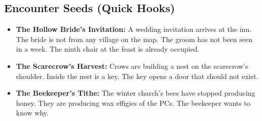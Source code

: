 \subsection*{Encounter Seeds (Quick Hooks)}
\begin{itemize}
\item \textbf{The Hollow Bride's Invitation:} A wedding invitation arrives at the inn. The bride is not from any village on the map. The groom has not been seen in a week. The ninth chair at the feast is already occupied.
\item \textbf{The Scarecrow's Harvest:} Crows are building a nest on the scarecrow's shoulder. Inside the nest is a key. The key opens a door that should not exist.
\item \textbf{The Beekeeper's Tithe:} The winter church's bees have stopped producing honey. They are producing wax effigies of the PCs. The beekeeper wants to know why.
\end{itemize}
